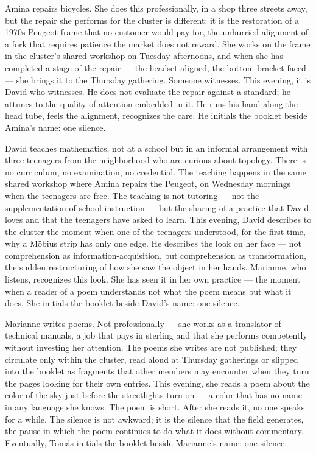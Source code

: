 Amina repairs bicycles. She does this professionally, in a shop three streets away, but the repair she performs for the cluster is different: it is the restoration of a 1970s Peugeot frame that no customer would pay for, the unhurried alignment of a fork that requires patience the market does not reward. She works on the frame in the cluster's shared workshop on Tuesday afternoons, and when she has completed a stage of the repair — the headset aligned, the bottom bracket faced — she brings it to the Thursday gathering. Someone witnesses. This evening, it is David who witnesses. He does not evaluate the repair against a standard; he attunes to the quality of attention embedded in it. He runs his hand along the head tube, feels the alignment, recognizes the care. He initials the booklet beside Amina's name: one silence.

David teaches mathematics, not at a school but in an informal arrangement with three teenagers from the neighborhood who are curious about topology. There is no curriculum, no examination, no credential. The teaching happens in the same shared workshop where Amina repairs the Peugeot, on Wednesday mornings when the teenagers are free. The teaching is not tutoring — not the supplementation of school instruction — but the sharing of a practice that David loves and that the teenagers have asked to learn. This evening, David describes to the cluster the moment when one of the teenagers understood, for the first time, why a Möbius strip has only one edge. He describes the look on her face — not comprehension as information-acquisition, but comprehension as transformation, the sudden restructuring of how she saw the object in her hands. Marianne, who listens, recognizes this look. She has seen it in her own practice — the moment when a reader of a poem understands not what the poem means but what it does. She initials the booklet beside David's name: one silence.

Marianne writes poems. Not professionally — she works as a translator of technical manuals, a job that pays in sterling and that she performs competently without investing her attention. The poems she writes are not published; they circulate only within the cluster, read aloud at Thursday gatherings or slipped into the booklet as fragments that other members may encounter when they turn the pages looking for their own entries. This evening, she reads a poem about the color of the sky just before the streetlights turn on — a color that has no name in any language she knows. The poem is short. After she reads it, no one speaks for a while. The silence is not awkward; it is the silence that the field generates, the pause in which the poem continues to do what it does without commentary. Eventually, Tomás initials the booklet beside Marianne's name: one silence.

